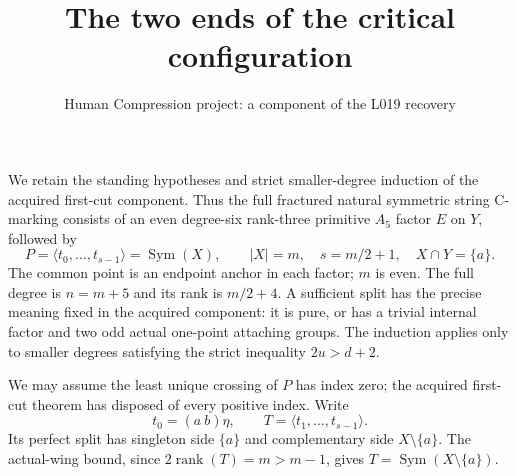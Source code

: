\documentclass[11pt,a4paper]{article}
\title{The two ends of the critical configuration}
\author{Human Compression project: a component of the L019 recovery}
\date{}
\newcommand{\gen}[1]{\langle#1\rangle}
\newcommand{\Sym}{\operatorname{Sym}}
\begin{document}
\maketitle
We retain the standing hypotheses and strict smaller-degree induction
of the acquired first-cut component. Thus the full fractured natural
symmetric string C-marking consists of an even degree-six rank-three
primitive $A_5$ factor $E$ on $Y$, followed by
\[
 P=\gen{t_0,\ldots,t_{s-1}}=\Sym(X),\qquad
 |X|=m,\quad s=m/2+1,\quad X\cap Y=\{a\}.
\]
The common point is an endpoint anchor in each factor; $m$ is even.
The full degree is $n=m+5$ and its rank is $m/2+4$.
A sufficient split has the precise meaning fixed in the acquired
component: it is pure, or has a trivial internal factor and two odd
actual one-point attaching groups. The induction applies only to
smaller degrees satisfying the strict inequality $2u>d+2$.

We may assume the least unique crossing of $P$ has index zero;
the acquired first-cut theorem has disposed of every positive index.
Write
\[
 t_0=(a\ b)\eta,\qquad T=\gen{t_1,\ldots,t_{s-1}}.
\]
Its perfect split has singleton side $\{a\}$ and complementary
side $X\setminus\{a\}$. The actual-wing bound, since
$2\operatorname{rank}(T)=m>m-1$, gives
$T=\Sym(X\setminus\{a\})$.
\end{document}
